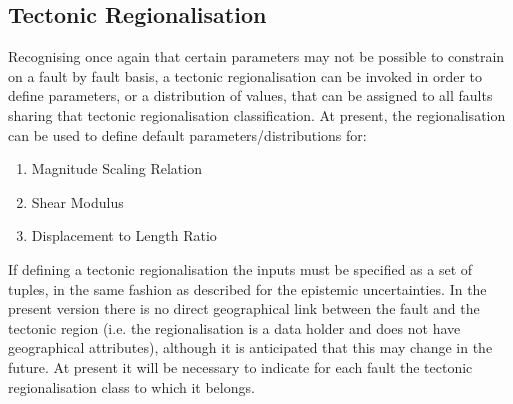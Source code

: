 \subsection{Tectonic Regionalisation}

Recognising once again that certain parameters may not be possible to constrain on a fault by fault basis, a tectonic regionalisation can be invoked in order to define parameters, or a distribution of values, that can be assigned to all faults sharing that tectonic regionalisation classification. At present, the regionalisation can be used to define default parameters/distributions for:

\begin{enumerate}
\item Magnitude Scaling Relation
\item Shear Modulus
\item Displacement to Length Ratio
\end{enumerate}

If defining a tectonic regionalisation the inputs must be specified as a set of tuples, in the same fashion as described for the epistemic uncertainties. In the present version there is no direct geographical link between the fault and the tectonic region (i.e. the regionalisation is a data holder and does not have geographical attributes), although it is anticipated that this may change in the future. At present it will be necessary to indicate for each fault the tectonic regionalisation class to which it belongs.


%
%


